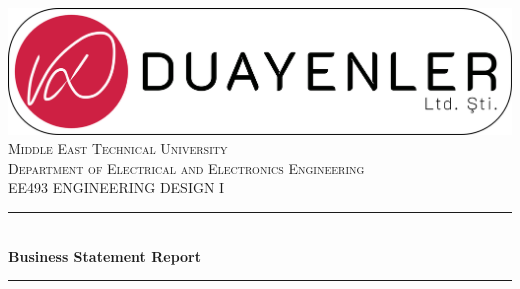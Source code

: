 \begin{titlepage}

\newcommand{\HRule}{\rule{\linewidth}{0.5mm}} %

\center %
\includegraphics[width=\textwidth,height=\textheight,keepaspectratio]{images/logo3-with-stroke}\\[1cm]

 

 

\textsc{\LARGE Middle East Technical University}\\[1.5cm] %
\textsc{\Large Department of Electrical and Electronics Engineering }\\[0.5cm] %
\textsc{\large EE493 ENGINEERING DESIGN I}\\[0.5cm] %


\HRule \\[0.4cm]

{ \huge \bfseries  Business Statement Report}\\[0cm] %
\HRule \\[1cm]
 


\end{titlepage}

